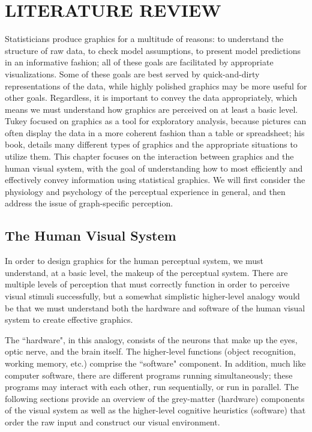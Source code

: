 \documentclass[11pt]{isuthesis}\usepackage[]{graphicx}\usepackage[]{color}
\begin{document}
\graphicspath{{Figure/LitReview/}{Images/LitReview/}}
\renewcommand{\floatpagefraction}{.99}



\chapter{LITERATURE REVIEW}\label{litreview}

Statisticians produce graphics for a multitude of reasons: to understand the structure of raw data, to check model assumptions, to present model predictions in an informative fashion; all of these goals are facilitated by appropriate visualizations. Some of these goals are best served by quick-and-dirty representations of the data, while highly polished graphics may be more useful for other goals. Regardless, it is important to convey the data appropriately, which means we must understand how graphics are perceived on at least a basic level. Tukey focused on graphics as a tool for exploratory analysis, because pictures can often display the data in a more coherent fashion than a table or spreadsheet; his book, \citet{eda} details many different types of graphics and the appropriate situations to utilize them. This chapter focuses on the interaction between graphics and the human visual system, with the goal of understanding how  to most efficiently and effectively convey information using statistical graphics. We will first consider the physiology and psychology of the perceptual experience in general, and then address the issue of graph-specific perception. 

\section{The Human Visual System}
In order to design graphics for the human perceptual system, we must understand, at a basic level, the makeup of the perceptual system. There are multiple levels of perception that must correctly function in order to perceive visual stimuli successfully, but a somewhat simplistic higher-level analogy would be that we must understand both the hardware and software of the human visual system to create effective graphics.

The ``hardware", in this analogy, consists of the neurons that make up the eyes, optic nerve, and the brain itself. The higher-level functions (object recognition, working memory, etc.) comprise the ``software" component. In addition, much like computer software, there are different programs running simultaneously; these programs may interact with each other, run sequentially, or run in parallel. The following sections provide an overview of the grey-matter (hardware) components of the visual system as well as the higher-level cognitive heuristics (software) that order the raw input and construct our visual environment. 
\end{document}
